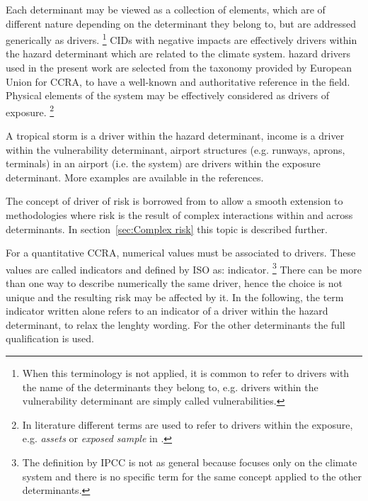 Each \gls{determinant} may be viewed as a collection of elements, which are of different nature depending on the \gls{determinant} they belong to, but are addressed generically as \glspl{driver}.%
\footnote{When this terminology is not applied, it is common to refer to \glspl{driver} with the name of the \glspl{determinant} they belong to, e.g. drivers within the \gls{vulnerability} determinant are simply called vulnerabilities.}
\Glspl{CID} with negative \glspl{impact} are effectively \glspl{driver} within the \gls{hazard} \gls{determinant} which are related to the climate system. \Gls{hazard} \glspl{driver} used in the present work are selected from the taxonomy provided by European Union for \gls{CCRA}, to have a well-known and authoritative reference in the field.\cite[177]{2024EU20212139}
Physical elements of the system may be effectively considered as \glspl{driver} of \gls{exposure}.%
\footnote{In literature different terms are used to refer to \glspl{driver} within the \gls{exposure}, e.g. \emph{assets} or \emph{exposed sample} in \cite{2022DeVivoRiskAssessment}.}
\begin{example}
  A tropical storm is a \gls{driver} within the \gls{hazard} \gls{determinant},\cite[15]{2017GIZRiskSupplement} income is a \gls{driver} within the \gls{vulnerability} \gls{determinant},\cite[493]{2021SimpsonAFramework} airport structures (e.g. runways, aprons, terminals) in an airport (i.e. the system) are \glspl{driver} within the \gls{exposure} \gls{determinant}.\cite[551]{2022DeVivoRiskAssessment} More examples are available in the references.
\end{example}
The concept of \gls{driver} of \gls{risk} is borrowed from \cite{2021SimpsonAFramework} to allow a smooth extension to methodologies where \gls{risk} is the result of complex interactions within and across \glspl{determinant}. In section~\ref{sec:Complex risk} this topic is described further.

For a quantitative \gls{CCRA}, numerical values must be associated to \glspl{driver}. These values are called \glspl{indicator} and defined by \gls{ISO} as: \glsdesc{indicator}.%
\footnote{The definition by \gls{IPCC} is not as general because focuses only on the climate system and there is no specific term for the same concept applied to the other \glspl{determinant}.}
There can be more than one way to describe numerically the same \gls{driver}, hence the choice is not unique and the resulting risk may be affected by it.
In the following, the term \gls{indicator} written alone refers to an \gls{indicator} of a \gls{driver} within the \gls{hazard} \gls{determinant}, to relax the lenghty wording. For the other \glspl{determinant} the full qualification is used.

